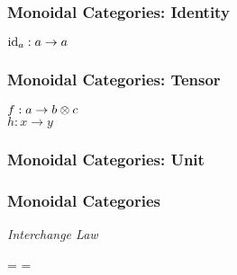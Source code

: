 \begin{frame}
    \frametitle{Monoidal Categories: Identity}

    \begin{center}
        $\operatorname{id}_a: a \to a$ \\ \vspace{0.5em}
        
    \end{center}
\end{frame}

\begin{frame}
    \frametitle{Monoidal Categories: Tensor}

    \begin{center}
        $f: a \to b \otimes c$ \\
        $h: x \to y$ \\ \vspace{0.5em}
    \end{center}
\end{frame}

\begin{frame}
    \frametitle{Monoidal Categories: Unit}

    \begin{center}
    \end{center}
\end{frame}

\begin{frame}
    \frametitle{Monoidal Categories}

    \begin{center}
        \textit{Interchange Law} \\ \vspace{0.5em}
        
        = 
        = 
    \end{center}
\end{frame}


